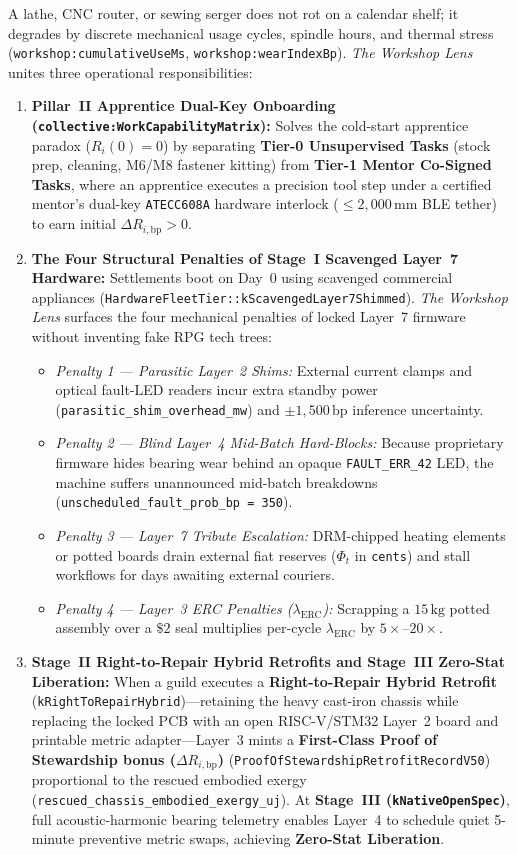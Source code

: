 A lathe, CNC router, or sewing serger does not rot on a calendar shelf; it degrades by discrete mechanical usage cycles, spindle hours, and thermal stress (\texttt{workshop:cumulativeUseMs}, \texttt{workshop:wearIndexBp}). \textit{The Workshop Lens} unites three operational responsibilities:
\begin{enumerate}
    \item \textbf{Pillar~II Apprentice Dual-Key Onboarding (\texttt{collective:WorkCapabilityMatrix}):} Solves the cold-start apprentice paradox ($R_i(0) = 0$) by separating \textbf{Tier-0 Unsupervised Tasks} (stock prep, cleaning, M6/M8 fastener kitting) from \textbf{Tier-1 Mentor Co-Signed Tasks}, where an apprentice executes a precision tool step under a certified mentor's dual-key \texttt{ATECC608A} hardware interlock ($\le 2{,}000\,\mathrm{mm}$ BLE tether) to earn initial $\Delta R_{i,\mathrm{bp}} > 0$.
    \item \textbf{The Four Structural Penalties of Stage~I Scavenged Layer~7 Hardware:} Settlements boot on Day~0 using scavenged commercial appliances (\texttt{HardwareFleetTier::kScavengedLayer7Shimmed}). \textit{The Workshop Lens} surfaces the four mechanical penalties of locked Layer~7 firmware without inventing fake RPG tech trees:
    \begin{itemize}
        \item \textit{Penalty 1 --- Parasitic Layer~2 Shims:} External current clamps and optical fault-LED readers incur extra standby power (\texttt{parasitic\_shim\_overhead\_mw}) and $\pm 1{,}500\,\mathrm{bp}$ inference uncertainty.
        \item \textit{Penalty 2 --- Blind Layer~4 Mid-Batch Hard-Blocks:} Because proprietary firmware hides bearing wear behind an opaque \texttt{FAULT\_ERR\_42} LED, the machine suffers unannounced mid-batch breakdowns (\texttt{unscheduled\_fault\_prob\_bp = 350}).
        \item \textit{Penalty 3 --- Layer~7 Tribute Escalation:} DRM-chipped heating elements or potted boards drain external fiat reserves ($\Phi_t$ in \texttt{cents}) and stall workflows for days awaiting external couriers.
        \item \textit{Penalty 4 --- Layer~3 ERC Penalties ($\lambda_{\mathrm{ERC}}$):} Scrapping a $15\,\mathrm{kg}$ potted assembly over a $\$2$ seal multiplies per-cycle $\lambda_{\mathrm{ERC}}$ by $5\times\text{--}20\times$.
    \end{itemize}
    \item \textbf{Stage~II Right-to-Repair Hybrid Retrofits and Stage~III Zero-Stat Liberation:} When a guild executes a \textbf{Right-to-Repair Hybrid Retrofit} (\texttt{kRightToRepairHybrid})---retaining the heavy cast-iron chassis while replacing the locked PCB with an open RISC-V/STM32 Layer~2 board and printable metric adapter---Layer~3 mints a \textbf{First-Class Proof of Stewardship bonus ($\Delta R_{i,\mathrm{bp}}$)} (\texttt{ProofOfStewardshipRetrofitRecordV50}) proportional to the rescued embodied exergy (\texttt{rescued\_chassis\_embodied\_exergy\_uj}). At \textbf{Stage~III (\texttt{kNativeOpenSpec})}, full acoustic-harmonic bearing telemetry enables Layer~4 to schedule quiet 5-minute preventive metric swaps, achieving \textbf{Zero-Stat Liberation}.

\end{enumerate}
